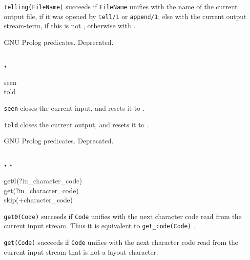 \texttt{telling(FileName)} succeeds if \texttt{FileName} unifies with the
name of the current output file, if it was opened by \texttt{tell/1} or
\texttt{append/1}; else with the current output stream-term, if this is not
, otherwise with .

\PlErrorsNone

\Portability

GNU Prolog predicates. Deprecated.

\subsubsection{,
               }

\begin{TemplatesOneCol}
seen\\
told

\end{TemplatesOneCol}

\Description

\texttt{seen} closes the current input, and resets it to
.

\texttt{told} closes the current output, and resets it to
.

\PlErrorsNone

\Portability

GNU Prolog predicates. Deprecated.

\subsubsection{,
               ,
               }

\begin{TemplatesOneCol}
get0(?in\_character\_code)\\
get(?in\_character\_code)\\
skip(+character\_code)

\end{TemplatesOneCol}

\Description

\texttt{get0(Code)} succeeds if \texttt{Code} unifies with the next
character code read from the current input stream. Thus it is equivalent to
\texttt{get\_code(Code)} .

\texttt{get(Code)} succeeds if \texttt{Code} unifies with the next character
code read from the current input stream that is not a layout character.

